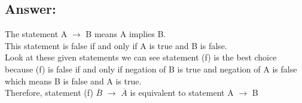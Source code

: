 \documentclass[10pt]{article}
\begin{document}
\subsection*{Answer:}
The statement A $\rightarrow$ B means A implies B. 
\\
This statement is false if and only if A is true and B is false.
\\
Look at these given statements we can see statement (f) is the best choice because (f) is false if and only if negation of B is true and negation of A is false which means B is false and A is true.
\\
Therefore, statement (f)  $\overline{B}$ $\rightarrow$  $\overline{A}$ is equivalent to statement A $\rightarrow$ B


\end{document}
